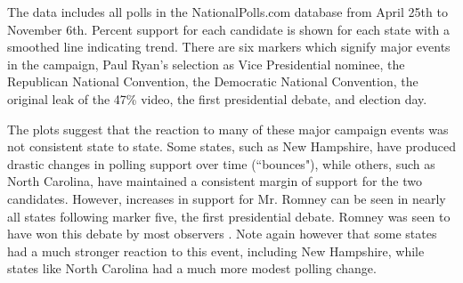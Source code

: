 \documentclass[11pt]{article}\usepackage{graphicx, color}
\begin{document}
The data includes all polls in the NationalPolls.com database from April 25th to November 6th. Percent support for each candidate is shown for each state with a smoothed line indicating trend. There are six markers which signify major events in the campaign, Paul Ryan's selection as Vice Presidential nominee, the Republican National Convention, the Democratic National Convention, the original leak of the 47\% video, the first presidential debate, and election day.

The plots suggest that the reaction to many of these major campaign events was not consistent state to state. Some states, such as New Hampshire, have produced drastic changes in polling support over time (``bounces"), while others, such as North Carolina, have maintained a consistent margin of support for the two candidates. However, increases in support for Mr. Romney can be seen in nearly all states following marker five, the first presidential debate. Romney was seen to have won this debate by most observers \cite{jj-debate}. Note again however that some states had a much stronger reaction to this event, including New Hampshire, while states like North Carolina had a much more modest polling change.
\end{document}

